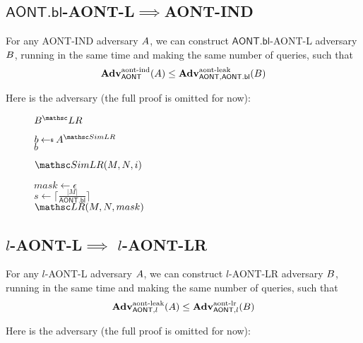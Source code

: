 \documentclass[11pt,twoside]{article}
\begin{document}
\subsection{$\mathsf{AONT.bl}$-AONT-L$\implies$AONT-IND}

\begin{theorem}
For any AONT-IND adversary $A$, we can construct $\mathsf{AONT.bl}$-AONT-L adversary $B$, running in the same time and making the same number of queries, such that $$\textbf{Adv}^\text{aont-ind}_{\mathsf{AONT}}(A)\le\textbf{Adv}^\text{aont-leak}_{\mathsf{AONT},\mathsf{AONT.bl}}(B)$$
\end{theorem}

Here is the adversary (the full proof is omitted for now):

\begin{figure}[H]
{
\underline{$\advB^\LRO$}

\begin{algorithm}[H]
$b\getsr \advA^{\procfont{SimLR}}$\\
\Return $b$
\end{algorithm}

\underline{$\procfont{SimLR}(M,N,i)$}

\begin{algorithm}[H]
$mask\gets \epsilon$\\
$s\gets \lceil\frac{|M|}{\mathsf{AONT.bl}}\rceil$\\
{
}
\Return $\LRO(M,N,mask)$
\end{algorithm}
}
\end{figure}

\subsection{$l$-AONT-L$\implies$ $l$-AONT-LR}

\begin{theorem}
For any $l$-AONT-L adversary $A$, we can construct $l$-AONT-LR adversary $B$, running in the same time and making the same number of queries, such that $$\textbf{Adv}^\text{aont-leak}_{\mathsf{AONT},l}(A)\le\textbf{Adv}^\text{aont-lr}_{\mathsf{AONT},l}(B)$$
\end{theorem}

Here is the adversary (the full proof is omitted for now):
\end{document}
